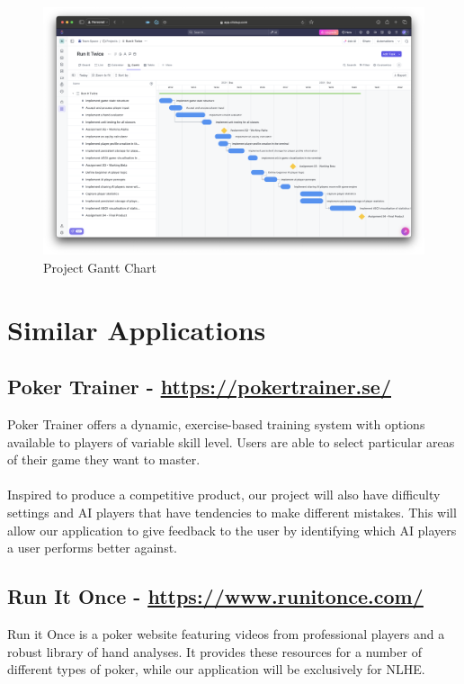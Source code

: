 \documentclass{article}
\let\oldhref\href
\renewcommand{\href}[2]{\uline{\oldhref{#1}{#2}}}
\begin{document}
\begin{figure}[H]
    \centering
    \includegraphics[width=\textwidth]{ProjectSchedule.png}
    \caption{Project Gantt Chart}
    \label{fig:project_schedule}
\end{figure}


\section*{Similar Applications}

\subsection*{Poker Trainer - \href{https://pokertrainer.se/}{https://pokertrainer.se/}}
Poker Trainer offers a dynamic, exercise-based training system with options available to players of variable skill level. Users are able to select particular areas of their game they want to master. 
\\ \\
Inspired to produce a competitive product, our project will also have difficulty settings and AI players that have tendencies to make different mistakes. This will allow our application to give feedback to the user by identifying which AI players a user performs better against.

\subsection*{Run It Once - \href{https://www.runitonce.com/}{https://www.runitonce.com/}}
 Run it Once is a poker website featuring videos from professional players and a robust library of hand analyses. It provides these resources for a number of different types of poker, while our application will be exclusively for NLHE.
\end{document}

